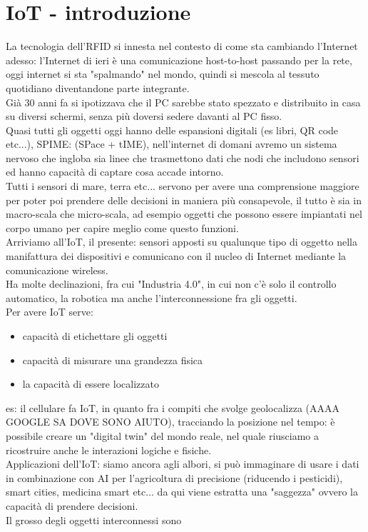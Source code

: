 \documentclass[oneside, 12pt]{extbook}
\begin{document}
\section{IoT - introduzione}
La tecnologia dell'RFID si innesta nel contesto di come sta cambiando l'Internet adesso: l'Internet di ieri è una comunicazione host-to-host passando per la rete, oggi internet si sta "spalmando" nel mondo, quindi si mescola al tessuto quotidiano diventandone parte integrante.\\Già 30 anni fa si ipotizzava che il PC sarebbe stato spezzato e distribuito in casa su diversi schermi, senza più doversi sedere davanti al PC fisso.\\Quasi tutti gli oggetti oggi hanno delle espansioni digitali (es libri, QR code etc...), SPIME: (SPace + tIME), nell'internet di domani avremo un sistema nervoso che ingloba sia linee che trasmettono dati che nodi che includono sensori ed hanno capacità di captare cosa accade intorno.\\Tutti i sensori di mare, terra etc... servono per avere una comprensione maggiore per poter poi prendere delle decisioni in maniera più consapevole, il tutto è sia in macro-scala che micro-scala, ad esempio oggetti che possono essere impiantati nel corpo umano per capire meglio come questo funzioni.\\Arriviamo all'IoT, il presente: sensori apposti su qualunque tipo di oggetto nella manifattura dei dispositivi e comunicano con il nucleo di Internet mediante la comunicazione wireless.\\Ha molte declinazioni, fra cui "Industria 4.0", in cui non c'è solo il controllo automatico, la robotica ma anche l'interconnessione fra gli oggetti.\\Per avere IoT serve:
\begin{itemize}
	\item capacità di etichettare gli oggetti
	\item capacità di misurare una grandezza fisica
	\item la capacità di essere localizzato
\end{itemize}
es: il cellulare fa IoT, in quanto fra i compiti che svolge geolocalizza (AAAA GOOGLE SA DOVE SONO AIUTO), tracciando la posizione nel tempo: è possibile creare un "digital twin" del mondo reale, nel quale riusciamo a ricostruire anche le interazioni logiche e fisiche.\\Applicazioni dell'IoT: siamo ancora agli albori, si può immaginare di usare i dati in combinazione con AI per l'agricoltura di precisione (riducendo i pesticidi), smart cities, medicina smart etc... da qui viene estratta una "saggezza" ovvero la capacità di prendere decisioni.\\Il grosso degli oggetti interconnessi sono
\end{document}
